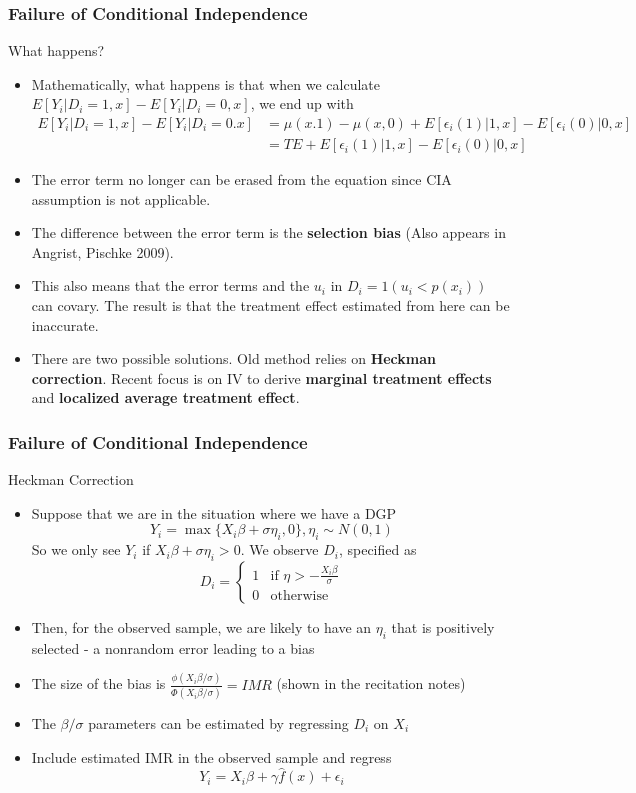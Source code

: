 \documentclass{beamer}
\begin{document}
\begin{frame}
\frametitle{Failure of Conditional Independence}
What happens?
\begin{itemize}
\item Mathematically, what happens is that when we calculate $E[Y_i|D_i=1,x]-E[Y_i|D_i=0,x]$, we end up with
\footnotesize{\begin{align*}
E[Y_i|D_i=1,x]-E[Y_i|D_i=0.x]&=\mu(x.1)-\mu(x,0)+E[\epsilon_i(1)|1,x]-E[\epsilon_i(0)|0,x]\\
&=TE+E[\epsilon_i(1)|1,x]-E[\epsilon_i(0)|0,x]
\end{align*}}\normalsize
\item The error term no longer can be erased from the equation since CIA assumption is not applicable.
\item The difference between the error term is the \textbf{selection bias} (Also appears in Angrist, Pischke 2009). 
\item This also means that the error terms and the $u_i$ in $D_i=1(u_i<p(x_i))$ can covary. The result is that the treatment effect estimated from here can be inaccurate. \par
\item There are two possible solutions. Old method relies on \textbf{Heckman correction}. Recent focus is on IV to derive \textbf{marginal treatment effects} and \textbf{localized average treatment effect}.
\end{itemize}
\end{frame}

\begin{frame}
\frametitle{Failure of Conditional Independence}
Heckman Correction
\begin{itemize}
\item Suppose that we are in the situation where we have a DGP
\[
Y_i = \max\{X_i\beta+\sigma\eta_i, 0\}, \eta_i \sim N(0,1)
\]
So we only see $Y_i$ if $X_i\beta+\sigma\eta_i>0$. We observe $D_i$, specified as
\[
D_i=\begin{cases}1 & \text{if }\eta>-\frac{X_i\beta}{\sigma}\\ 0 & \text{otherwise} \end{cases}
\]
\item Then, for the observed sample, we are likely to have an $\eta_i$ that is positively selected - a nonrandom error leading to a bias
\item The size of the bias is $\frac{\phi(X_i\beta/\sigma)}{\Phi(X_i\beta/\sigma)}=IMR$ (shown in the recitation notes)
\item The $\beta/\sigma$ parameters can be estimated by regressing $D_i$ on $X_i$
\item Include estimated IMR in the observed sample and regress \[
Y_i = X_i\beta+\gamma\hat{f}(x)+\epsilon_i
\]
\end{itemize}
\end{frame}
\end{document}
